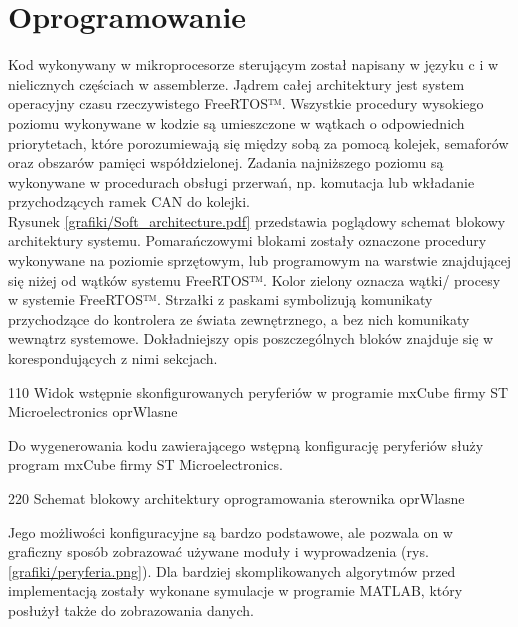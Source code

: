 \section{Oprogramowanie}
\label{s:oprogramowanie}

Kod wykonywany w mikroprocesorze sterującym został napisany w języku c i w nielicznych częściach w assemblerze. Jądrem całej architektury jest system operacyjny czasu rzeczywistego FreeRTOS™. Wszystkie procedury wysokiego poziomu wykonywane w kodzie są umieszczone w wątkach o odpowiednich priorytetach, które porozumiewają się między sobą za pomocą kolejek, semaforów oraz obszarów pamięci współdzielonej. Zadania najniższego poziomu są wykonywane w procedurach obsługi przerwań, np. komutacja lub wkładanie przychodzących ramek CAN do kolejki. \\

Rysunek \ref{grafiki/Soft_architecture.pdf} przedstawia poglądowy schemat blokowy architektury systemu. Pomarańczowymi blokami zostały oznaczone procedury wykonywane na poziomie sprzętowym, lub programowym na warstwie znajdującej się niżej od wątków systemu FreeRTOS™. Kolor zielony oznacza wątki/ procesy w systemie FreeRTOS™. Strzałki z paskami symbolizują komunikaty przychodzące do kontrolera ze świata zewnętrznego, a bez nich komunikaty wewnątrz systemowe. Dokładniejszy opis poszczególnych bloków znajduje się w korespondujących z nimi sekcjach.

	{110}
	{Widok wstępnie skonfigurowanych peryferiów w programie mxCube firmy ST Microelectronics}
	{oprWlasne}
	
Do wygenerowania kodu zawierającego wstępną konfigurację peryferiów służy program mxCube firmy ST Microelectronics.
	
	{220}
	{Schemat blokowy architektury oprogramowania sterownika}
	{oprWlasne}
	
\clearpage

Jego możliwości konfiguracyjne są bardzo podstawowe, ale pozwala on w graficzny sposób zobrazować używane moduły i wyprowadzenia (rys. \ref{grafiki/peryferia.png}). Dla bardziej skomplikowanych algorytmów przed implementacją zostały wykonane symulacje w programie MATLAB, który posłużył także do zobrazowania danych.






















\clearpage